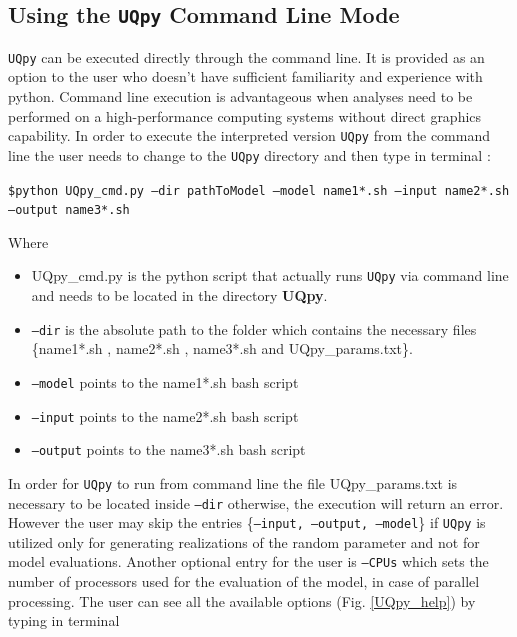 \subsection{Using the \texttt{UQpy}  Command Line Mode}

\noindent
\texttt{UQpy} can be executed directly through the command line. It is provided as an option to the user who doesn't have sufficient familiarity and experience with python. Command line execution is advantageous when analyses need to be performed on a high-performance computing systems without direct graphics capability. In order to  execute the interpreted version \texttt{UQpy} from the command line the user needs to  change to the \texttt{UQpy} directory and then type in terminal :

\vspace{4mm}
\noindent
{\scriptsize \texttt{\$python UQpy\_cmd.py --dir pathToModel --model name1*.sh --input name2*.sh --output name3*.sh}}


\vspace{4mm}
\noindent
Where

\begin{itemize}
 \item  {\color{blue} UQpy\_cmd.py} is the python script that actually runs \texttt{UQpy}  via command line and needs to be located in the directory \textbf{UQpy}.
 
 \item \texttt{--dir} is the absolute path to the folder which contains the necessary files  {\{\color{red}name1*.sh} , {\color{red}name2*.sh} , {\color{red}name3*.sh} and {\color{magenta}UQpy\_params.txt}\}.
 
 \item \texttt{--model} points to the {\color{red}name1*.sh} bash script
 
  \item \texttt{--input} points to the {\color{red}name2*.sh} bash script
  
   \item \texttt{--output} points to the {\color{red}name3*.sh} bash script
 
 \end{itemize}


\noindent
In order for \texttt{UQpy}  to run from command line  the file  {\color{magenta}UQpy\_params.txt} is necessary to be located inside \texttt{--dir} otherwise, the execution will return an error. However the user may skip the entries \{\texttt{--input, --output, --model}\}  if  \texttt{UQpy}  is utilized only for generating realizations of the random parameter and not for model evaluations.  Another optional entry for the user is \texttt{--CPUs} which sets the number of processors used for the evaluation of the model, in case of parallel processing.   The user can see all the available options (Fig. \ref{UQpy_help}) by typing in terminal

